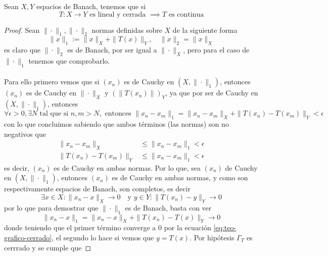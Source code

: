 \begin{teo}
    Sean $X, Y$ espacios de Banach, tenemos que si
    \begin{equation*}
        T: X \to Y \text{ es lineal y cerrada } \implies T \text{ es continua}
    \end{equation*}
\begin{proof}
    Sean $\|\cdot\|_1, \|\cdot\|_2$ normas definidas sobre $X$ de la siguiente forma
    \begin{equation*}
        \|x\|_1 := \|x\|_X + \|T(x)\|_Y, \quad \|x\|_2 = \|x\|_X
    \end{equation*}
    es claro que $\|\cdot\|_2$ es de Banach, por ser igual a $\|\cdot\|_X$, pero para el caso de $\|\cdot\|_1$ tenemos que comprobarlo. \\ \\
    \noindent
    Para ello primero vemos que si $(x_n)$ es de Cauchy en $(X, \|\cdot\|_1)$, entonces $(x_n)$ es de Cauchy en $\|\cdot\|_X$ y $(\|T(x_n)\|)_Y$, ya que por ser de Cauchy en $(X, \|\cdot\|_1)$, entonces
    \begin{equation*}
        \forall \epsilon > 0, \exists N \text{ tal que si } n, m > N, \text{ entonces } \|x_n - x_m\|_1= \|x_n - x_m\|_X+\|T(x_n) - T(x_m)\|_Y < \epsilon
    \end{equation*}
    con lo que concluimos sabiendo que ambos términos (las normas) son no negativos que
    \begin{align*}
        \|x_n - x_m\|_X &\leq \|x_n - x_m\|_1 < \epsilon \\
        \|T(x_n) - T(x_m)\|_Y &\leq \|x_n - x_m\|_1 < \epsilon 
    \end{align*}
    es decir, $(x_n)$ es de Cauchy en ambas normas. Por lo que, sea $(x_n)$ de Cauchy en $(X, \|\cdot\|_1)$, entonces $(x_n)$ es de Cauchy en ambas normas, y como son respectivamente espacios de Banach, son completos, es decir
    \begin{equation}\label{eq:teo-grafico-cerrado}
        \exists x \in X : \|x_n - x\|_X \to 0 \quad \text{y } y \in Y : \|T(x_n) - y\|_Y \to 0
    \end{equation}
    por lo que para demostrar que $\|\cdot\|_1$ es de Banach, basta con ver
    \begin{equation*}
        \|x_n - x\|_1 = \|x_n - x\|_X + \|T(x_n) - T(x)\|_Y \to 0
    \end{equation*}
    donde teniendo que el primer término converge a $0$ por la ecuación \ref{eq:teo-grafico-cerrado}, el segundo lo hace si vemos que $y=T(x)$. Por hipótesis $\Gamma_T$ es cerrrado y se cumple que 

\end{proof}
\end{teo}
